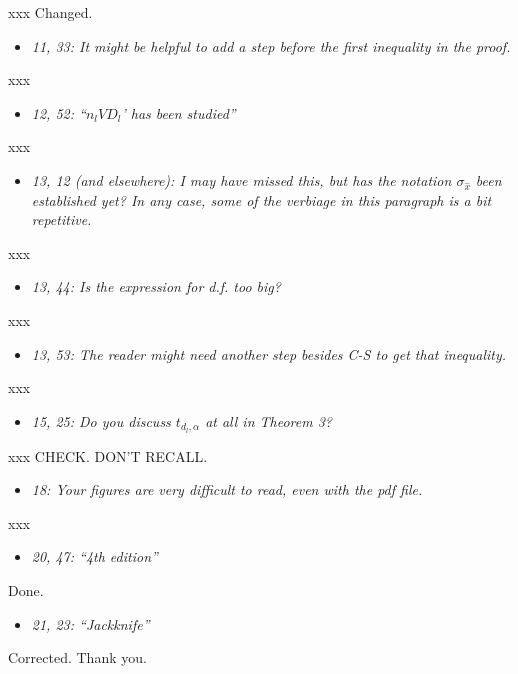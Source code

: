 \documentclass[11pt,notitlepage,onecolumn]{article}
\newcommand{\noi}{\noindent}
\begin{document}
\noi
xxx Changed. 
\medskip 



\begin{itemize}
\item[] \textit{11, 33: It might be helpful to add a step before the first inequality in the proof.}
\end{itemize}

\noi
xxx  
\medskip 



\begin{itemize}
\item[] \textit{12, 52: ``$n_l VD_l$' has been studied''}
\end{itemize}

\noi
xxx  
\medskip 



\begin{itemize}
\item[] \textit{13, 12 (and elsewhere): I may have missed this, but has the notation $\sigma_{\hat{x}}$ been established yet? 
In any case, some of the verbiage in this paragraph is a bit repetitive.}
\end{itemize}

\noi
xxx  
\medskip 



\begin{itemize}
\item[] \textit{13, 44: Is the expression for d.f. too big?}
\end{itemize}

\noi
xxx  
\medskip 



\begin{itemize}
\item[] \textit{13, 53: The reader might need another step besides C-S to get that inequality.}
\end{itemize}

\noi
xxx  
\medskip 



\begin{itemize}
\item[] \textit{15, 25: Do you discuss $t_{d_l,\alpha}$ at all in Theorem 3?}
\end{itemize}

\noi
xxx  CHECK. DON'T RECALL.
\medskip 



\begin{itemize}
\item[] \textit{18: Your figures are very difficult to read, even with the pdf file.}
\end{itemize}

\noi
xxx  
\medskip 



\begin{itemize}
\item[] \textit{20, 47: ``4th edition''}
\end{itemize}

\noi
Done.
\medskip 



\begin{itemize}
\item[] \textit{21, 23: ``\it Jackknife''}
\end{itemize}

\noi
Corrected. Thank you. 
\end{document}
